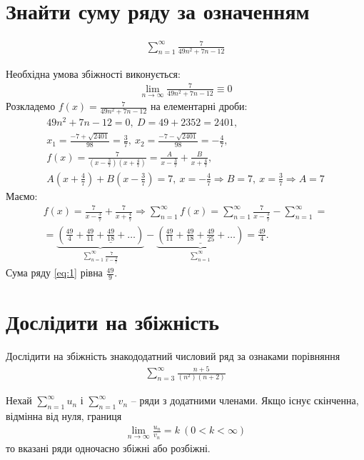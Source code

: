\nocite{*}
\section{Знайти суму ряду за означенням}
\begin{gather}
	\sum_{n=1}^\infty\frac{7}{49n^2+7n-12} \label{eq:1}
\end{gather}

\solving

Необхідна умова збіжності виконується:
\begin{gather}
	\lim_{n\to\infty} \frac{7}{49n^2+7n-12} \equiv 0
\end{gather}
Розкладемо \(f(x) = \frac{7}{49n^2+7n-12}\) на елементарні дроби:
\begin{gather}
	49n^2+7n-12=0,\ D=49+2352 = 2401,\\
	x_1=\frac{-7+\sqrt{2401}}{98}=\frac{3}{7},\ x_2=\frac{-7-\sqrt{2401}}{98}=-\frac{4}{7},\\
	f(x)=\frac{7}{(x-\frac{3}{7})(x+\frac{4}{7})} = \frac{A}{x-\frac{3}{7}}+\frac{B}{x+\frac{4}{7}},\\
	A\left(x+\frac{4}{7}\right)+B\left(x-\frac{3}{7}\right)=7,\ x=-\frac{4}{7}\Rightarrow B= 7,\ x=\frac{3}{7}\Rightarrow A=7
\end{gather}
Маємо:
\begin{gather}
	f(x)=\frac{7}{x-\frac{3}{7}}+\frac{7}{x+\frac{4}{7}}\Rightarrow \sum_{n=1}^\infty f(x) = \sum_{n=1}^\infty \frac{7}{x-\frac{3}{7}}-\sum_{n=1}^\infty=\\
	=\underbrace{\left(\frac{49}{4}+\underline{\frac{49}{11}+\frac{49}{18}+\dots}\right)}_{\sum_{n=1}^\infty \frac{7}{x-\frac{3}{7}}}-\underbrace{\left(\underline{\frac{49}{11}+\frac{49}{18}+\frac{49}{25}+\dots}\right)}_{\sum_{n=1}^\infty} = \frac{49}{4}.
\end{gather}
\ansver
Сума ряду \ref{eq:1} рівна \(\frac{49}{9}\).

\section{Дослідити на збіжність}
Дослідити на збіжність знакододатний числовий ряд за ознаками порівняння
\begin{gather}
	\sum_{n=3}^\infty \frac{n+5}{(n^2)(n+2)} \label{eq:2}
\end{gather}

\begin{thm}
	\label{dfn:zbiz}
	Нехай \(\sum_{n=1}^\infty u_n\) і \(\sum_{n=1}^\infty v_n\) -- ряди з додатними членами. Якщо існує скінченна, відмінна від нуля, границя
	\begin{gather}
		\lim_{n\to\infty}\frac{u_n}{v_n}=k\ (0<k<\infty)
	\end{gather}
	то вказані ряди одночасно збіжні або розбіжні.
\end{thm}

